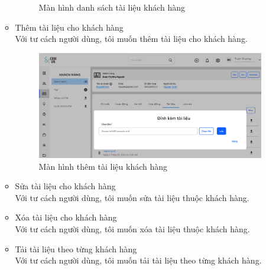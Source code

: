 \documentclass[12pt,a4paper]{article}
\begin{document}
\begin{enumerate}
\begin{itemize}
\begin{figure}[H]
                \vspace{0.5cm}
                \caption{Màn hình danh sách tài liệu khách hàng}
                \label{dstailieuKH}
            \end{figure}
            \item Thêm tài liệu cho khách hàng \\
            Với tư cách người dùng, tôi muốn thêm tài liệu cho khách hàng.
            \begin{figure}[H]
                \centering \includegraphics[width=\textwidth]{Img/Nguyet/Khachhang/Themtailieu.png}
                \vspace{0.5cm}
                \caption{Màn hình thêm tài liệu khách hàng}
                \label{themtailieuKH}
            \end{figure}
            \item Sửa tài liệu cho khách hàng \\
            Với tư cách người dùng, tôi muốn sửa tài liệu thuộc khách hàng.
            \item Xóa tài liệu cho khách hàng
            \\Với tư cách người dùng, tôi muốn xóa tài liệu thuộc khách hàng.

            \item Tải tài liệu theo từng khách hàng
            \\Với tư cách người dùng, tôi muốn tải tài liệu theo từng khách hàng.


\end{itemize}
\end{enumerate}
\end{document}

